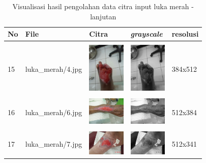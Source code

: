 \begin{table}[H]
	\centering
	\caption{Visualisasi hasil pengolahan data citra input luka merah - lanjutan}
	\label{tabel_input_10}
	\begin{tabular}{|m{0.2in}|m{1.2in}|m{0.7in}|m{0.7in}|m{0.7in}|}
		\hline
		\textbf{No} & \textbf{File} & \textbf{Citra} & \textbf{\emph{grayscale}} & \textbf{resolusi} \\
		\hline
		
		& &  &  &\\
		15 & 
		luka\_merah/4.jpg &
		\includegraphics[width=0.7in]{dataset/dataset_3/luka_merah/ready/4.jpg}&
		\includegraphics[width=0.7in]{dataset/dataset_3/luka_merah/ready/4_gray.jpg}&
		384x512\\
		\hline
		
		& &  &  &\\
		16& 
		luka\_merah/6.jpg &
		\includegraphics[width=0.7in]{dataset/dataset_3/luka_merah/ready/6.jpg}&
		\includegraphics[width=0.7in]{dataset/dataset_3/luka_merah/ready/6_gray.jpg}&
		512x384\\
		\hline
		
		& &  &  &\\
		17& 
		luka\_merah/7.jpg &
		\includegraphics[width=0.7in]{dataset/dataset_3/luka_merah/ready/7.jpg}&
		\includegraphics[width=0.7in]{dataset/dataset_3/luka_merah/ready/7_gray.jpg}&
		512x341\\
		\hline
		

\end{tabular}
\end{table}
